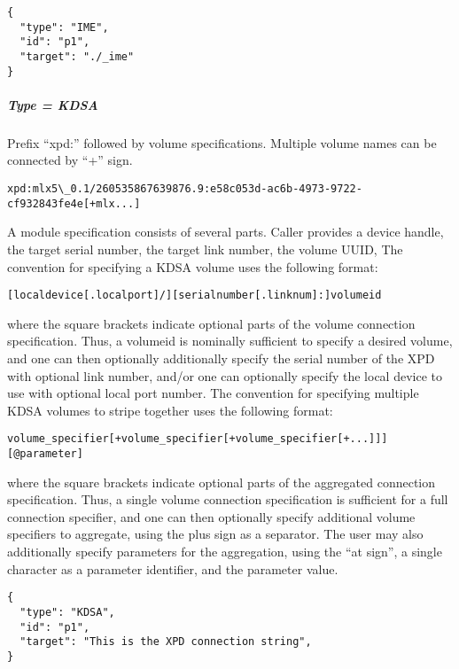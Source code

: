 \begin{lstlisting}
{
  "type": "IME",
  "id": "p1",
  "target": "./_ime"
}
\end{lstlisting}
\FloatBarrier
\vspace{\gapsize}


\subparagraph{Type = KDSA}
Prefix ``xpd:'' followed by volume specifications. Multiple volume names can be connected by ``+'' sign.

\begin{lstlisting}
xpd:mlx5\_0.1/260535867639876.9:e58c053d-ac6b-4973-9722-cf932843fe4e[+mlx...]
\end{lstlisting}

A module specification consists of several parts.
Caller provides a device handle, the target serial number, the target link number, the volume UUID,
The convention for specifying a KDSA volume uses the following format:

\begin{lstlisting}
[localdevice[.localport]/][serialnumber[.linknum]:]volumeid
\end{lstlisting}

where the square brackets indicate optional parts of the volume connection specification.
Thus, a volumeid is nominally sufficient to specify a desired volume, and one can then optionally additionally 
specify the serial number of the XPD with optional link number, and/or one can optionally specify the local 
device to use with optional local port number.
The convention for specifying multiple KDSA volumes to stripe together uses the following format:

\begin{lstlisting}
volume_specifier[+volume_specifier[+volume_specifier[+...]]][@parameter]
\end{lstlisting}

where the square brackets indicate optional parts of the aggregated connection specification. Thus, a single
volume connection specification is sufficient for a full connection specifier, and one can then optionally specify
additional volume specifiers to aggregate, using the plus sign as a separator. The user may also additionally
specify parameters for the aggregation, using the “at sign”, a single character as a parameter identifier, and the
parameter value.

\begin{lstlisting}
{
  "type": "KDSA",
  "id": "p1",
  "target": "This is the XPD connection string",
}
\end{lstlisting}
\FloatBarrier
\vspace{\gapsize}

